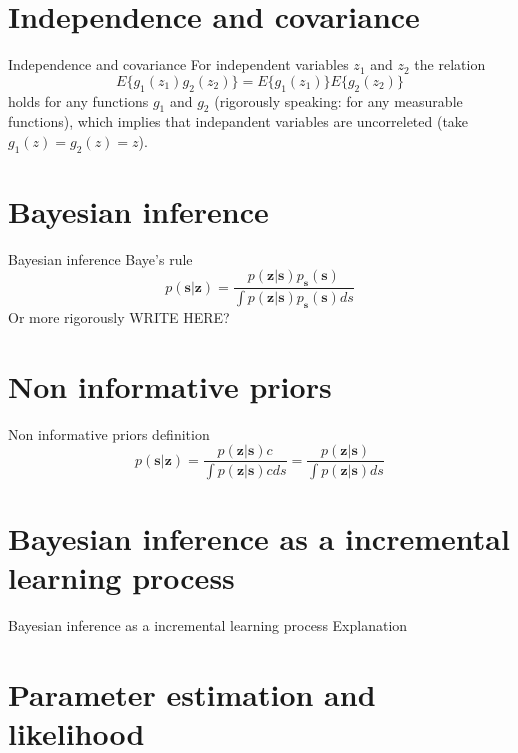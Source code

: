 \documentclass{beamer}
\begin{document}
\section{Independence and covariance}

\begin{frame}{Independence and covariance}
  For independent variables $z_1$ and $z_2$ the relation
  \[
  E\{g_1(z_1)g_2(z_2)\} = E\{g_1(z_1)\}E\{g_2(z_2)\}
  \]
  holds for any functions $g_1$ and $g_2$
  (rigorously speaking: for any measurable functions), which implies that
  indepandent variables are uncorreleted (take $g_1(z) = g_2(z) = z$).
\end{frame}

\section{Bayesian inference}

\begin{frame}{Bayesian inference}
  Baye's rule
  \[
  p(\mathbf{s}|\mathbf{z}) =
  \frac{p(\mathbf{z}|\mathbf{s})p_{\mathbf{s}}(\mathbf{s})}{\int p(\mathbf{z}|\mathbf{s})p_{\mathbf{s}}(\mathbf{s})ds}
  \]
  Or more rigorously WRITE HERE?
\end{frame}

\section{Non informative priors}

\begin{frame}{Non informative priors}
  definition
  \[
  p(\mathbf{s}|\mathbf{z}) =
  \frac{p(\mathbf{z}|\mathbf{s})c}{\int p(\mathbf{z}|\mathbf{s})cds} =
  \frac{p(\mathbf{z}|\mathbf{s})}{\int p(\mathbf{z}|\mathbf{s})ds}
  \]
\end{frame}

\section{Bayesian inference as a incremental learning process}

\begin{frame}{Bayesian inference as a incremental learning process}
  Explanation
\end{frame}

\section{Parameter estimation and likelihood}
\end{document}
